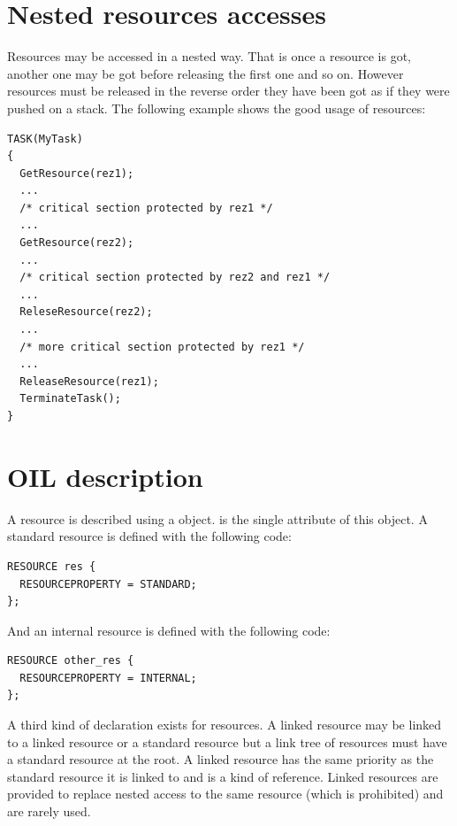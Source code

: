 \section{Nested resources accesses}
\label{sec:resnested}

Resources may be accessed in a nested way. That is once a resource is got, another one may be got before releasing the first one and so on. However resources must be released in the reverse order they have been got as if they were pushed on a stack. The following example shows the good usage of resources:

\begin{lstlisting}
TASK(MyTask)
{
  GetResource(rez1);
  ...
  /* critical section protected by rez1 */
  ...
  GetResource(rez2);
  ...
  /* critical section protected by rez2 and rez1 */
  ...
  ReleseResource(rez2);
  ...
  /* more critical section protected by rez1 */
  ...
  ReleaseResource(rez1);
  TerminateTask();
}
\end{lstlisting}



\section{OIL description}

A resource is described using a  object.  is the single attribute of this object. A standard resource is defined with the following code:

\begin{lstlisting}[language=OIL]
RESOURCE res {
  RESOURCEPROPERTY = STANDARD;
};
\end{lstlisting}

And an internal resource is defined with the following code:

\begin{lstlisting}[language=OIL]
RESOURCE other_res {
  RESOURCEPROPERTY = INTERNAL;
};
\end{lstlisting}

A third kind of declaration exists for {\bfseries{}} resources. A linked resource may be linked to a linked resource or a standard resource but a link tree of resources must have a standard resource at the root. A linked resource has the same priority as the standard resource it is linked to and is a kind of reference. Linked resources are provided to replace nested access to the same resource (which is prohibited) and are rarely used.

